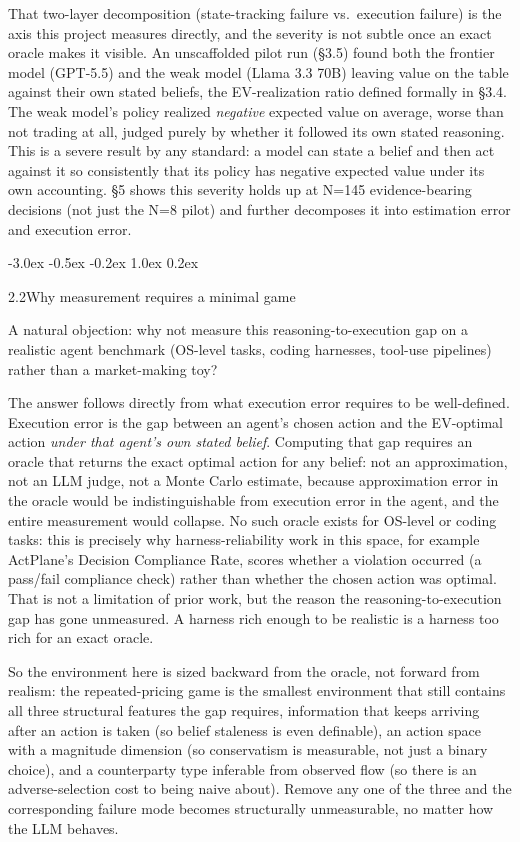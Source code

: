 \documentclass[
  11pt,
]{article}
\makeatletter
\renewcommand{\subsection}{%
  \@startsection{subsection}{2}{\z@}%
                {-3.0ex \@plus -0.5ex \@minus -0.2ex}%
                { 1.0ex \@plus  0.2ex}%
                {\normalsize\bf\raggedright}%
}
\makeatother
\begin{document}
That two-layer decomposition (state-tracking failure vs.~execution failure) is the axis this project measures directly, and the severity is not subtle once an exact oracle makes it visible. An unscaffolded pilot run (§3.5) found both the frontier model (GPT-5.5) and the weak model (Llama 3.3 70B) leaving value on the table against their own stated beliefs, the EV-realization ratio defined formally in §3.4. The weak model's policy realized \emph{negative} expected value on average, worse than not trading at all, judged purely by whether it followed its own stated reasoning. This is a severe result by any standard: a model can state a belief and then act against it so consistently that its policy has negative expected value under its own accounting. §5 shows this severity holds up at N=145 evidence-bearing decisions (not just the N=8 pilot) and further decomposes it into estimation error and execution error.

\subsection{2.2\quad Why measurement requires a minimal game}\label{why-measurement-requires-a-minimal-game}

A natural objection: why not measure this reasoning-to-execution gap on a realistic agent benchmark (OS-level tasks, coding harnesses, tool-use pipelines) rather than a market-making toy?

The answer follows directly from what execution error requires to be well-defined. Execution error is the gap between an agent's chosen action and the EV-optimal action \emph{under that agent's own stated belief}. Computing that gap requires an oracle that returns the exact optimal action for any belief: not an approximation, not an LLM judge, not a Monte Carlo estimate, because approximation error in the oracle would be indistinguishable from execution error in the agent, and the entire measurement would collapse. No such oracle exists for OS-level or coding tasks: this is precisely why harness-reliability work in this space, for example ActPlane's Decision Compliance Rate, scores whether a violation occurred (a pass/fail compliance check) rather than whether the chosen action was optimal. That is not a limitation of prior work, but the reason the reasoning-to-execution gap has gone unmeasured. A harness rich enough to be realistic is a harness too rich for an exact oracle.

So the environment here is sized backward from the oracle, not forward from realism: the repeated-pricing game is the smallest environment that still contains all three structural features the gap requires, information that keeps arriving after an action is taken (so belief staleness is even definable), an action space with a magnitude dimension (so conservatism is measurable, not just a binary choice), and a counterparty type inferable from observed flow (so there is an adverse-selection cost to being naive about). Remove any one of the three and the corresponding failure mode becomes structurally unmeasurable, no matter how the LLM behaves.
\end{document}
